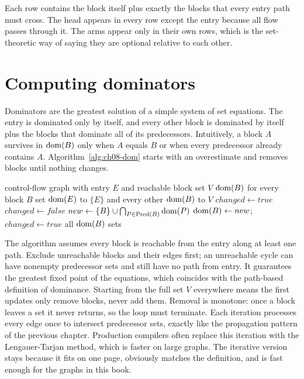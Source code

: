Each row contains the block itself plus exactly the blocks that every entry path must cross.
The head appears in every row except the entry because all flow passes through it.
The arms appear only in their own rows, which is the set-theoretic way of saying they are optional relative to each other.
\section{Computing dominators}
\label{sec:ch08-computing-dominators}

Dominators are the greatest solution of a simple system of set equations.
The entry is dominated only by itself, and every other block is dominated by itself plus the blocks that dominate all of its predecessors.
Intuitively, a block $A$ survives in $\operatorname{dom}(B)$ only when $A$ equals $B$ or when every predecessor already contains $A$.
Algorithm~\ref{alg:ch08-dom} starts with an overestimate and removes blocks until nothing changes.
\begin{algorithm}
\caption{Iterative computation of dominator sets.}
\label{alg:ch08-dom}
\begin{pseudocode}
\Require control-flow graph with entry $E$ and reachable block set $V$
\Ensure $\operatorname{dom}(B)$ for every block $B$
\State set $\operatorname{dom}(E)$ to $\{E\}$ and every other $\operatorname{dom}(B)$ to $V$
\State $changed \gets true$
\State $changed \gets false$
\State $new \gets \{B\} \cup \bigcap_{P\in\operatorname{Pred}(B)}\operatorname{dom}(P)$
 \State $\operatorname{dom}(B)\gets new$; $changed\gets true$ \EndIf
\EndFor
\EndWhile
\State \Return all $\operatorname{dom}(B)$ sets
\EndFunction
\end{pseudocode}
\end{algorithm}
The algorithm assumes every block is reachable from the entry along at least one path.
Exclude unreachable blocks and their edges first; an unreachable cycle can have nonempty predecessor sets and still have no path from entry.
It guarantees the greatest fixed point of the equations, which coincides with the path-based definition of dominance.
Starting from the full set $V$ everywhere means the first updates only remove blocks, never add them.
Removal is monotone: once a block leaves a set it never returns, so the loop must terminate.
Each iteration processes every edge once to intersect predecessor sets, exactly like the propagation pattern of the previous chapter.
Production compilers often replace this iteration with the Lengauer-Tarjan method, which is faster on large graphs.
The iterative version stays because it fits on one page, obviously matches the definition, and is fast enough for the graphs in this book.

